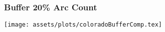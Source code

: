 \begin{frame}
    \frametitle{Buffer 20\% Arc Count}

    \texttt{[image: assets/plots/coloradoBufferComp.tex]}

\end{frame}